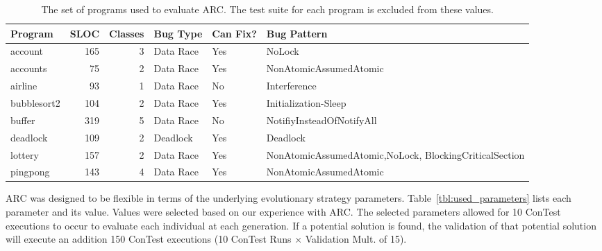 \begin{table}[h]
\caption{The set of programs used to evaluate ARC. The test suite for each
program is excluded from these values.}
\begin{center}
\begin{tabular}{|l|r|r|l|l|p{4.5cm}|}
\hline
\textbf{Program} & \textbf{SLOC} & \textbf{Classes} & \textbf{Bug Type} & \textbf{Can Fix?} & \textbf{Bug Pattern}\\
\hline
account & 165 & 3 & Data Race & Yes & NoLock\\
\hline
accounts & 75 & 2 & Data Race & Yes & NonAtomicAssumedAtomic\\
\hline
airline & 93 & 1 & Data Race & No & Interference\\
\hline
bubblesort2 & 104 & 2 & Data Race & Yes & Initialization-Sleep\\
\hline
buffer & 319 & 5 & Data Race & No & NotifiyInsteadOfNotifyAll\\
\hline
deadlock & 109 & 2 & Deadlock & Yes & Deadlock\\
\hline
lottery & 157 & 2 & Data Race & Yes & NonAtomicAssumedAtomic,\newline NoLock, BlockingCriticalSection\\
\hline
pingpong & 143 & 4 & Data Race & Yes & NonAtomicAssumedAtomic\\
\hline
\end{tabular}
\label{tbl:used_programs}
\end{center}
\end{table}

ARC was designed to be flexible in terms of the underlying evolutionary strategy parameters. Table~\ref{tbl:used_parameters} lists each parameter and its value. Values were selected based on our
experience with ARC. The selected parameters allowed for 10 ConTest executions
to occur to evaluate each individual at each generation. If a potential
solution is found, the validation of that potential solution will execute an
addition 150 ConTest executions (10 ConTest Runs $\times$ Validation Mult. of
15).


